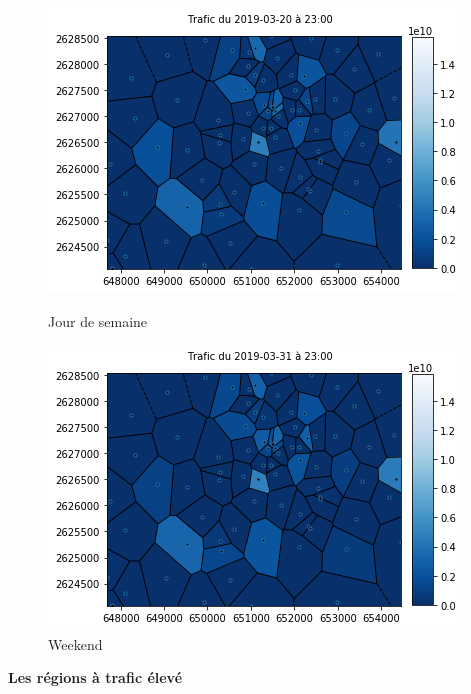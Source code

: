 \documentclass{report}
\begin{document}
\begin{figure}[!htb]
   \begin{minipage}{0.4\textwidth}
     \centering
     \includegraphics[scale=0.55]{images/23_20.png}
     \caption{Jour de semaine}\label{Fig:Data1}
   \end{minipage}\hfill
   \begin{minipage}{0.4\textwidth}
     \centering
     \includegraphics[scale=0.55]{images/23_31.png}
     \caption{Weekend }\label{Fig:Data2}
   \end{minipage}
\end{figure} 
\textbf{Les régions à trafic élevé }
\end{document}
